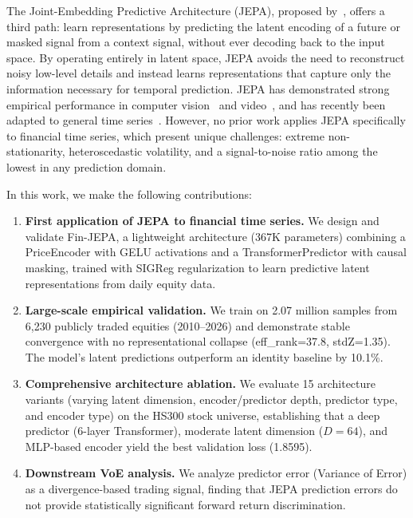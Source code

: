 \documentclass[11pt]{article}
\begin{document}
The Joint-Embedding Predictive Architecture (JEPA), proposed by~\citet{lecun2022path}, offers a third path: learn representations by predicting the latent encoding of a future or masked signal from a context signal, without ever decoding back to the input space. By operating entirely in latent space, JEPA avoids the need to reconstruct noisy low-level details and instead learns representations that capture only the information necessary for temporal prediction. JEPA has demonstrated strong empirical performance in computer vision~\citep{assran2023ijepa} and video~\citep{bardes2024vjepa}, and has recently been adapted to general time series~\citep{ennadir2025tsjepa}. However, no prior work applies JEPA specifically to financial time series, which present unique challenges: extreme non-stationarity, heteroscedastic volatility, and a signal-to-noise ratio among the lowest in any prediction domain.

In this work, we make the following contributions:

\begin{enumerate}[leftmargin=*,nosep]
  \item \textbf{First application of JEPA to financial time series.} We design and validate Fin-JEPA, a lightweight architecture (367K parameters) combining a PriceEncoder with GELU activations and a TransformerPredictor with causal masking, trained with SIGReg regularization to learn predictive latent representations from daily equity data.
  \item \textbf{Large-scale empirical validation.} We train on 2.07 million samples from 6,230 publicly traded equities (2010--2026) and demonstrate stable convergence with no representational collapse (eff\_rank=37.8, stdZ=1.35). The model's latent predictions outperform an identity baseline by 10.1\%.
  \item \textbf{Comprehensive architecture ablation.} We evaluate 15 architecture variants (varying latent dimension, encoder/predictor depth, predictor type, and encoder type) on the HS300 stock universe, establishing that a deep predictor (6-layer Transformer), moderate latent dimension ($D=64$), and MLP-based encoder yield the best validation loss (1.8595).
  \item \textbf{Downstream VoE analysis.} We analyze predictor error (Variance of Error) as a divergence-based trading signal, finding that JEPA prediction errors do not provide statistically significant forward return discrimination.
\end{enumerate}
\end{document}
